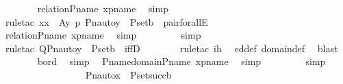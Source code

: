 \begin{isabellebody}
\ \ \ \ \ \ \isamarkupfalse%
\ relation{\isacharunderscore}{\kern0pt}P{\isacharunderscore}{\kern0pt}name\ xpname\ \isamarkupfalse%
\ simp\ \isanewline
\ \ \ \ \ \ \isamarkupfalse%
\ {\isacharparenleft}{\kern0pt}rule{\isacharunderscore}{\kern0pt}tac\ x{\isacharequal}{\kern0pt}x\ \ A{\isacharequal}{\kern0pt}{\isachardoublequoteopen}{\isasymlambda}y\ p{\isachardot}{\kern0pt}\ Pn{\isacharunderscore}{\kern0pt}auto{\isacharparenleft}{\kern0pt}{\isasympi}{\isacharparenright}{\kern0pt}{\isacharbackquote}{\kern0pt}y\ {\isasymin}\ P{\isacharunderscore}{\kern0pt}set{\isacharparenleft}{\kern0pt}b{\isacharparenright}{\kern0pt}{\isachardoublequoteclose}\ \ pair{\isacharunderscore}{\kern0pt}forallE{\isacharparenright}{\kern0pt}\ \isanewline
\ \ \ \ \ \ \isamarkupfalse%
\ relation{\isacharunderscore}{\kern0pt}P{\isacharunderscore}{\kern0pt}name\ xpname\ \isamarkupfalse%
\ simp\ \isanewline
\ \ \ \ \ \ \isamarkupfalse%
\ simp\ \isanewline
\ \ \ \ \ \ \isamarkupfalse%
\ {\isacharparenleft}{\kern0pt}rule{\isacharunderscore}{\kern0pt}tac\ Q{\isacharequal}{\kern0pt}{\isachardoublequoteopen}Pn{\isacharunderscore}{\kern0pt}auto{\isacharparenleft}{\kern0pt}{\isasympi}{\isacharparenright}{\kern0pt}{\isacharbackquote}{\kern0pt}y\ {\isasymin}\ P{\isacharunderscore}{\kern0pt}set{\isacharparenleft}{\kern0pt}b{\isacharparenright}{\kern0pt}{\isachardoublequoteclose}\ \ iffD{}{\isacharparenright}{\kern0pt}\isanewline
\ \ \ \ \ \ \isamarkupfalse%
\ {\isacharparenleft}{\kern0pt}rule{\isacharunderscore}{\kern0pt}tac\ ih{\isacharparenright}{\kern0pt}\ \isamarkupfalse%
\ ed{\isacharunderscore}{\kern0pt}def\ domain{\isacharunderscore}{\kern0pt}def\ \isamarkupfalse%
\ blast\ \isanewline
\ \ \ \ \ \ \isamarkupfalse%
\ bord\ \isamarkupfalse%
\ simp\ \isamarkupfalse%
\ P{\isacharunderscore}{\kern0pt}name{\isacharunderscore}{\kern0pt}domain{\isacharunderscore}{\kern0pt}P{\isacharunderscore}{\kern0pt}name\ xpname\ \isamarkupfalse%
\ simp\ \isanewline
\ \ \ \ \ \ \isamarkupfalse%
\ simp\isanewline
\ \ \ \ \ \ \isamarkupfalse%
\ \isanewline
\ \ \ \ \isamarkupfalse%
\ \isamarkupfalse%
\ {\isachardoublequoteopen}{\isachardot}{\kern0pt}{\isachardot}{\kern0pt}{\isachardot}{\kern0pt}\ {\isasymlongleftrightarrow}\ Pn{\isacharunderscore}{\kern0pt}auto{\isacharparenleft}{\kern0pt}{\isasympi}{\isacharparenright}{\kern0pt}{\isacharbackquote}{\kern0pt}x\ {\isasymin}\ P{\isacharunderscore}{\kern0pt}set{\isacharparenleft}{\kern0pt}succ{\isacharparenleft}{\kern0pt}b{\isacharparenright}{\kern0pt}{\isacharparenright}{\kern0pt}{\isachardoublequoteclose}\ \isanewline

\end{isabellebody}
